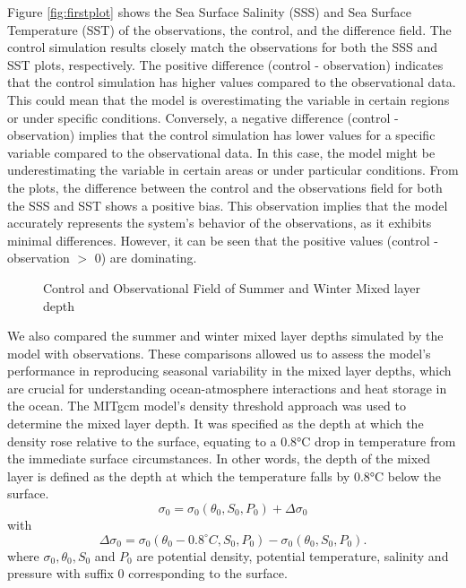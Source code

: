 \documentclass[12pt]{article}
\begin{document}
\noindent Figure \ref{fig:firstplot} shows the Sea Surface Salinity (SSS) and Sea Surface Temperature (SST) of the observations, the control, and the difference field. The control simulation results closely match the observations for both the SSS and SST plots, respectively. The positive difference (control - observation) indicates that the control simulation has higher values compared to the observational data. This could mean that the model is overestimating the variable in certain regions or under specific conditions. Conversely, a negative difference (control - observation) implies that the control simulation has lower values for a specific variable compared to the observational data. In this case, the model might be underestimating the variable in certain areas or under particular conditions. From the plots, the difference between the control and the observations field for both the SSS and SST shows a positive bias. This observation implies that the model accurately represents the system's behavior of the observations, as it exhibits minimal differences. However, it can be seen that the positive values (control - observation $>$ 0) are dominating.


\begin{figure}
    \begin{center}
    \caption{Control and Observational Field of Summer and Winter Mixed layer depth}
    \label{fig:secondplot}
    \end{center}
\end{figure}

\noindent We also compared the summer and winter mixed layer depths simulated by the model with observations. These comparisons allowed us to assess the model's performance in reproducing seasonal variability in the mixed layer depths, which are crucial for understanding ocean-atmosphere interactions and heat storage in the ocean.  The MITgcm model's density threshold approach was used to determine the mixed layer depth. It was specified as the depth at which the density rose relative to the surface, equating to a 0.8°C drop in temperature from the immediate surface circumstances. In other words, the depth of the mixed layer is defined as the depth at which the temperature falls by 0.8°C below the surface.
\begin{equation}
    \sigma_0 = \sigma_0(\theta_0, S_0, P_0) + \Delta \sigma_0
\end{equation}
with
\begin{equation}
    \Delta \sigma_0 = \sigma_0(\theta_0 - 0.8^\circ C, S_0, P_0)-\sigma_0(\theta_0, S_0, P_0).
\end{equation}
where $\sigma_0,\theta_0, S_0$ and $P_0 $ are potential density, potential temperature, salinity and pressure with suffix 0 corresponding to the surface.\\
\end{document}
